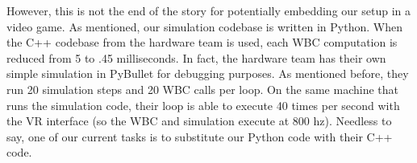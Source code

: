 However, this is not the end of the story for potentially embedding our setup in a video game. As mentioned, our simulation codebase is written in Python. When the C++ codebase from the hardware team is used, each WBC computation is reduced from 5 to .45 milliseconds. In fact, the hardware team has their own simple simulation in PyBullet for debugging purposes. As mentioned before, they run 20 simulation steps and 20 WBC calls per loop. On the same machine that runs the simulation code, their loop is able to execute 40 times per second with the VR interface (so the WBC and simulation execute at 800 hz). Needless to say, one of our current tasks is to substitute our Python code with their C++ code.
